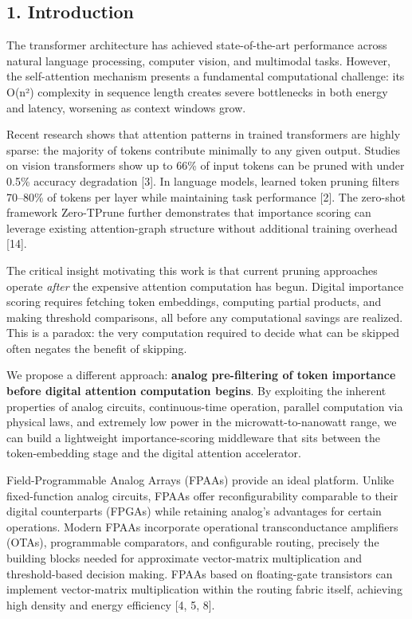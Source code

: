 \subsection{1. Introduction}\label{introduction}

The transformer architecture has achieved state-of-the-art performance
across natural language processing, computer vision, and multimodal
tasks. However, the self-attention mechanism presents a fundamental
computational challenge: its O(n²) complexity in sequence length creates
severe bottlenecks in both energy and latency, worsening as context
windows grow.

Recent research shows that attention patterns in trained transformers
are highly sparse: the majority of tokens contribute minimally to any
given output. Studies on vision transformers show up to 66\% of input
tokens can be pruned with under 0.5\% accuracy degradation {[}3{]}. In
language models, learned token pruning filters 70--80\% of tokens per
layer while maintaining task performance {[}2{]}. The zero-shot
framework Zero-TPrune further demonstrates that importance scoring can
leverage existing attention-graph structure without additional training
overhead {[}14{]}.

The critical insight motivating this work is that current pruning
approaches operate \emph{after} the expensive attention computation has
begun. Digital importance scoring requires fetching token embeddings,
computing partial products, and making threshold comparisons, all before
any computational savings are realized. This is a paradox: the very
computation required to decide what can be skipped often negates the
benefit of skipping.

We propose a different approach: \textbf{analog pre-filtering of token
importance before digital attention computation begins}. By exploiting
the inherent properties of analog circuits, continuous-time operation,
parallel computation via physical laws, and extremely low power in the
microwatt-to-nanowatt range, we can build a lightweight
importance-scoring middleware that sits between the token-embedding
stage and the digital attention accelerator.

Field-Programmable Analog Arrays (FPAAs) provide an ideal platform.
Unlike fixed-function analog circuits, FPAAs offer reconfigurability
comparable to their digital counterparts (FPGAs) while retaining
analog's advantages for certain operations. Modern FPAAs incorporate
operational transconductance amplifiers (OTAs), programmable
comparators, and configurable routing, precisely the building blocks
needed for approximate vector-matrix multiplication and threshold-based
decision making. FPAAs based on floating-gate transistors can implement
vector-matrix multiplication within the routing fabric itself, achieving
high density and energy efficiency {[}4, 5, 8{]}.

